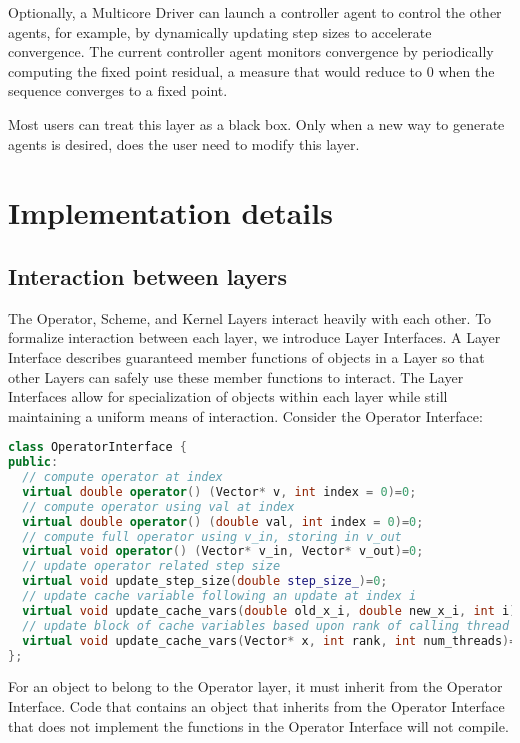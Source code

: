 Optionally, a Multicore Driver can launch a controller agent to control the other agents, for example, by dynamically updating step sizes to accelerate convergence.
The current controller agent monitors convergence by periodically computing the fixed point residual, a measure that would reduce to 0 when the sequence converges to a fixed point.

Most users can treat this layer as a black box. Only when a new way to generate agents is desired, does the user need to modify this layer.

\section{Implementation details}\label{sc:implement}

\subsection{Interaction between layers} \label{sc:interface}

The Operator, Scheme, and Kernel Layers interact heavily with each other. To formalize interaction between each layer, we introduce Layer Interfaces. A Layer Interface describes guaranteed member functions of objects in a Layer so that other Layers can safely use these member functions to interact. The Layer Interfaces allow for specialization of objects within each layer while still maintaining a uniform means of interaction. Consider the Operator Interface:
\begin{lstlisting}[language=C++,label={Operator_Interface}]
class OperatorInterface {
public:
  // compute operator at index
  virtual double operator() (Vector* v, int index = 0)=0;
  // compute operator using val at index
  virtual double operator() (double val, int index = 0)=0;
  // compute full operator using v_in, storing in v_out
  virtual void operator() (Vector* v_in, Vector* v_out)=0;
  // update operator related step size
  virtual void update_step_size(double step_size_)=0;
  // update cache variable following an update at index i
  virtual void update_cache_vars(double old_x_i, double new_x_i, int i)=0;
  // update block of cache variables based upon rank of calling thread
  virtual void update_cache_vars(Vector* x, int rank, int num_threads)=0;
};
\end{lstlisting}

For an object to belong to the Operator layer, it must inherit from the Operator Interface.
Code that contains an object that inherits from the Operator Interface that does not implement the functions in the Operator Interface will not compile.

